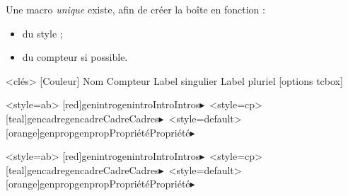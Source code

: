 \documentclass[french,11pt,a4paper]{article}
\begin{document}
Une macro \textit{unique} existe, afin de créer la boîte en fonction :

\begin{itemize}
  \item du \textsf{style} ;
  \item du \textsf{compteur} si possible.
\end{itemize}

\begin{codehigh}[language=latex/latex2,style/main=cyan!10,style/code=cyan!10]
\GenereBoite<clés>%
  [Couleur]%
  {Nom}%
  {Compteur}%
  {Label singulier}
  {Label pluriel}
  [options tcbox]

\end{codehigh}

\GenereBoite<style=ab>%
 [red]{genintro}{genintro}{Intro}{Intros}{$\blacktriangleright$\,}
\GenereBoite<style=cp>%
  [teal]{gencadre}{gencadre}{Cadre}{Cadres}{$\blacktriangleright$\,}
\GenereBoite<style=default>%
  [orange]{genprop}{genprop}{Propriété}{Propriété}{$\blacktriangleright$}

\begin{codehigh}[language=latex/latex2,style/main=cyan!10,style/code=cyan!10]
\GenereBoite<style=ab>%
  [red]{genintro}{genintro}{Intro}{Intros}{$\blacktriangleright$\,}
\GenereBoite<style=cp>%
  [teal]{gencadre}{gencadre}{Cadre}{Cadres}{$\blacktriangleright$\,}
\GenereBoite<style=default>%
  [orange]{genprop}{genprop}{Propriété}{Propriété}{$\blacktriangleright$}
\end{codehigh}

\begin{demohigh}[language=latex/latex2,style/main=cyan!10,style/code=cyan!10]
\begin{genintro}
\lipsum[1][1]
\end{genintro}

\begin{gencadre}
\lipsum[2][1]
\end{gencadre}

\begin{genprop}
\lipsum[3][1]
\end{genprop}
\end{demohigh}

\pagebreak
\end{document}
